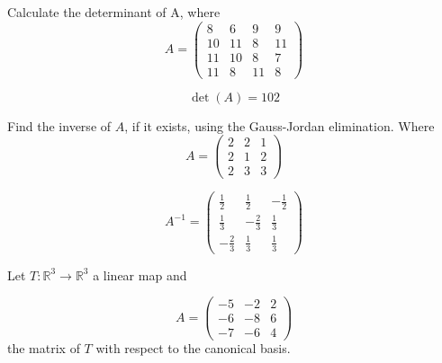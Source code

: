\begin{questions}

\question Calculate the determinant of A, where
$$
A=\left(\begin{array}{rrrr}
8 & 6 & 9 & 9 \\
10 & 11 & 8 & 11 \\
11 & 10 & 8 & 7 \\
11 & 8 & 11 & 8
\end{array}\right)
$$

\begin{solution}
$$\det(A)=102$$
\end{solution}

\question Find the inverse of $A$, if it exists, using the Gauss-Jordan elimination. Where
$$
A=\left(\begin{array}{rrr}
2 & 2 & 1 \\
2 & 1 & 2 \\
2 & 3 & 3
\end{array}\right)
$$

\begin{solution}
$$A^{-1}=\left(\begin{array}{rrr}
\frac{1}{2} & \frac{1}{2} & -\frac{1}{2} \\
\frac{1}{3} & -\frac{2}{3} & \frac{1}{3} \\
-\frac{2}{3} & \frac{1}{3} & \frac{1}{3}
\end{array}\right)$$
\end{solution}

\question Let $T:\mathbb{R}^3\rightarrow\mathbb{R}^3$  a linear map and
 
$$
A=\left(\begin{array}{rrr}
-5 & -2 & 2 \\
-6 & -8 & 6 \\
-7 & -6 & 4
\end{array}\right)
$$
the matrix of $T$ with respect to the canonical basis.
\end{questions}
